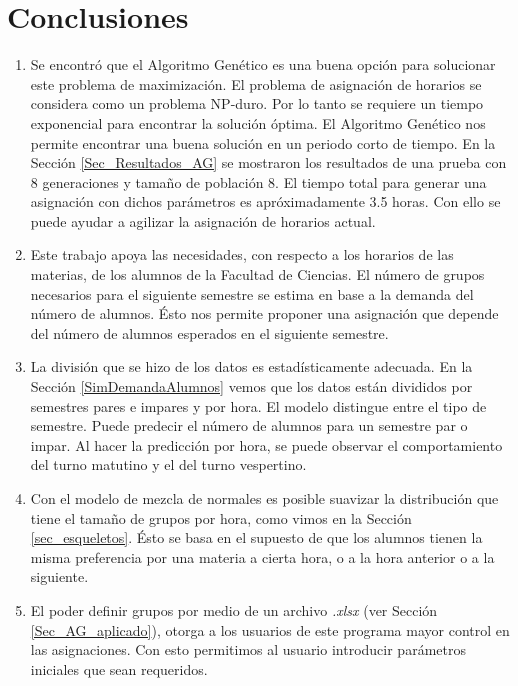 \chapter{Conclusiones}

\begin{enumerate}
\item Se encontró que el Algoritmo Genético es una buena opción para solucionar este problema de maximización. El problema de asignación de horarios se considera como un problema NP-duro. Por lo tanto se requiere un tiempo exponencial para encontrar la solución óptima. El Algoritmo Genético nos permite encontrar una buena solución en un periodo corto de tiempo. En la Sección \ref{Sec_Resultados_AG} se mostraron los resultados de una prueba con 8 generaciones y tamaño de población 8. El tiempo total para generar una asignación con dichos parámetros es apróximadamente 3.5 horas. Con ello se puede ayudar a agilizar la asignación de horarios actual.%

\item Este trabajo apoya las necesidades, con respecto a los horarios de las materias, de los alumnos de la Facultad de Ciencias. El número de grupos necesarios para el siguiente semestre se estima en base a la demanda del número de alumnos. Ésto nos permite proponer una asignación que depende del número de alumnos esperados en el siguiente semestre.

\item La división que se hizo de los datos es estadísticamente adecuada. En la Sección \ref{SimDemandaAlumnos} vemos que los datos están divididos por semestres pares e impares y por hora. El modelo distingue entre el tipo de semestre. Puede predecir el número de alumnos para un semestre par o impar. Al hacer la predicción por hora, se puede observar el comportamiento del turno matutino y el del turno vespertino.

\item Con el modelo de mezcla de normales es posible suavizar la distribución que tiene el tamaño de grupos por hora, como vimos en la Sección \ref{sec_esqueletos}. Ésto se basa en el supuesto de que los alumnos tienen la misma preferencia por una materia a cierta hora, o a la hora anterior o a la siguiente. %

\item El poder definir grupos por medio de un archivo \textit{.xlsx} (ver Sección \ref{Sec_AG_aplicado}), otorga a los usuarios de este programa mayor control en las asignaciones. Con esto permitimos al usuario introducir parámetros iniciales que sean requeridos.


\end{enumerate}
